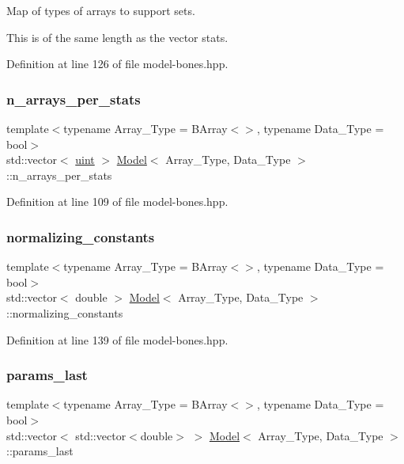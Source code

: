 Map of types of arrays to support sets. 

This is of the same length as the vector {\ttfamily stats}. 

Definition at line 126 of file model-\/bones.\+hpp.

\mbox{\label{class_model_ab43351423d375b537a1a6a497c65caa1}} 
\subsubsection{\texorpdfstring{n\+\_\+arrays\+\_\+per\+\_\+stats}{n\_arrays\_per\_stats}}
{\footnotesize\ttfamily template$<$typename Array\+\_\+\+Type  = B\+Array$<$$>$, typename Data\+\_\+\+Type  = bool$>$ \\
std\+::vector$<$ \hyperlink{typedefs_8hpp_a91ad9478d81a7aaf2593e8d9c3d06a14}{uint} $>$ \hyperlink{class_model}{Model}$<$ Array\+\_\+\+Type, Data\+\_\+\+Type $>$\+::n\+\_\+arrays\+\_\+per\+\_\+stats}



Definition at line 109 of file model-\/bones.\+hpp.

\mbox{\label{class_model_ad4ec6d7a19e7a47fb6ffabbf191e1877}} 
\subsubsection{\texorpdfstring{normalizing\+\_\+constants}{normalizing\_constants}}
{\footnotesize\ttfamily template$<$typename Array\+\_\+\+Type  = B\+Array$<$$>$, typename Data\+\_\+\+Type  = bool$>$ \\
std\+::vector$<$ double $>$ \hyperlink{class_model}{Model}$<$ Array\+\_\+\+Type, Data\+\_\+\+Type $>$\+::normalizing\+\_\+constants}



Definition at line 139 of file model-\/bones.\+hpp.

\mbox{\label{class_model_a627aaec1fe2c0e25546f68da78b0c00b}} 
\subsubsection{\texorpdfstring{params\+\_\+last}{params\_last}}
{\footnotesize\ttfamily template$<$typename Array\+\_\+\+Type  = B\+Array$<$$>$, typename Data\+\_\+\+Type  = bool$>$ \\
std\+::vector$<$ std\+::vector$<$double$>$ $>$ \hyperlink{class_model}{Model}$<$ Array\+\_\+\+Type, Data\+\_\+\+Type $>$\+::params\+\_\+last}



